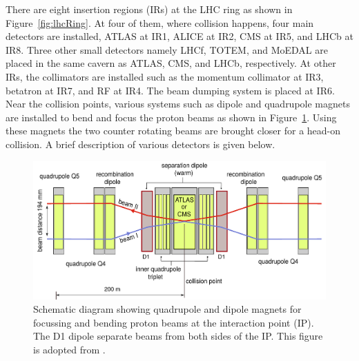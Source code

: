 There are eight insertion regions (IRs) at the LHC ring as shown in Figure~\ref{fig:lhcRing}. 
At four of them, where collision happens, four main detectors are installed,
ATLAS at IR1, ALICE at IR2, CMS at IR5, and LHCb at IR8. Three other small detectors namely 
LHCf, TOTEM, and MoEDAL are placed in the same cavern as ATLAS, CMS, and LHCb, 
respectively. At other IRs, the collimators are installed 
such as the momentum collimator at IR3, betatron at IR7, and RF at IR4. The beam dumping system 
is placed at IR6. Near the collision points, various systems such as dipole and quadrupole
magnets are installed to bend and focus the proton beams as shown in Figure~\ref{fig:lhc_beamBend}.
Using these magnets the two counter rotating beams are brought closer for a head-on
collision. A brief description of various detectors is given below.
\begin{figure}
  \begin{center}
  \includegraphics[width=0.75\linewidth]{Experiment/LHC/Image/lhc_beamBend.pdf}
  \caption{Schematic diagram showing quadrupole and dipole magnets 
	  for focussing and bending proton beams at the interaction point (IP). 
	The D1 dipole separate beams from both sides of the IP. This figure is adopted 
	from \cite{Schmidt:2207171}.}
  \label{fig:lhc_beamBend}
  \end{center}
\end{figure}
